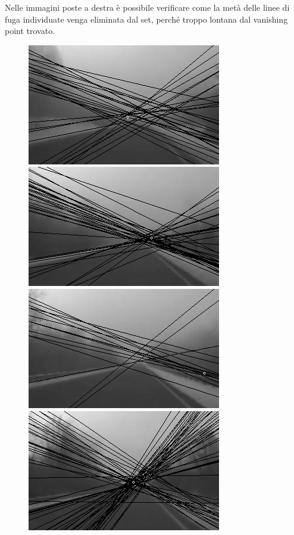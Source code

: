 \documentclass[12pt]{report}
\begin{document}
\noindent Nelle immagini poste a destra \`e possibile verificare come la met\`a delle linee di fuga individuate venga eliminata dal set, perch\'e troppo lontana dal vanishing point trovato.\\

\newcommand{\imTrackScale}{0.6}
\begin{figure}[H]
\begin{minipage}[c]{0.5\linewidth}
	\centering
	\includegraphics[scale=\imTrackScale]{images/bF_0000_15.png}
	\includegraphics[scale=\imTrackScale]{images/bF_0020_15.png}
	\includegraphics[scale=\imTrackScale]{images/bF_0040_15.png}
	\includegraphics[scale=\imTrackScale]{images/bF_0060_15.png}

\end{minipage}
\end{figure}
\end{document}
